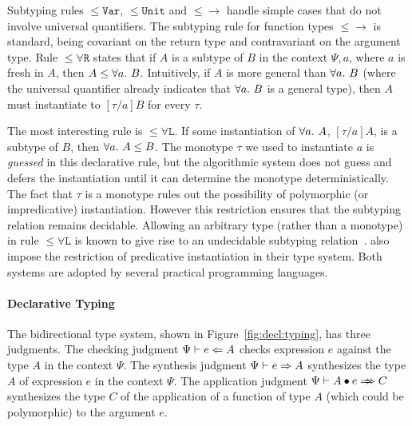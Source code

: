 Subtyping rules $\mathtt{{\le}Var}$, $\mathtt{{\le}Unit}$ and $\mathtt{{\le}{\to}}$
handle simple cases that do not involve universal quantifiers.
The subtyping rule for function types $\mathtt{{\le}{\to}}$ is standard,
being covariant on the return type and contravariant on the argument type.
Rule $\mathtt{{\le}\forall R}$ states that if $A$ is a subtype of $B$
in the context $\Psi, a$, where $a$ is fresh in $A$, then $A\le\all B$.
Intuitively, if $A$ is more general than $\all B$ (where the universal quantifier
already indicates that $\all B$ is a general type),
then $A$ must instantiate to $[\tau/a]B$ for every $\tau$.

The most interesting rule is $\mathtt{{\le}\forall L}$.
If some instantiation of $\all A$, $[\tau/a]A$, is a subtype of $B$,
then $\all A \le B$.
The monotype $\tau$ we used to instantiate $a$ is \emph{guessed} in this
declarative rule, but the algorithmic system does not guess and defers the
instantiation until it can determine the monotype deterministically.
The fact that $\tau$ is a monotype rules out the possibility of
polymorphic (or impredicative) instantiation.
However this restriction ensures that the subtyping relation remains
decidable. Allowing an arbitrary type (rather than a monotype) in rule $\mathtt{{\le}\forall L}$
is known to give rise to an undecidable subtyping relation~\cite{tiuryn1996subtyping}.
\citet{jones2007practical} also impose the restriction of
predicative instantiation in their type system.
Both systems are adopted by several practical programming languages.

\paragraph{Declarative Typing}
The bidirectional type system, shown in Figure~\ref{fig:decl:typing}, has three judgments.
The checking judgment $\Psi\vdash e\Leftarrow A$ checks expression $e$ against the type $A$ in the context $\Psi$.
The synthesis judgment $\Psi\vdash e\Rightarrow A$ synthesizes the type $A$ of expression $e$ in the context $\Psi$.
The application judgment $\Psi\vdash \appInf{A}{e}{C}$ synthesizes the type $C$ of the application of a function of type $A$
(which could be polymorphic) to the argument $e$.

